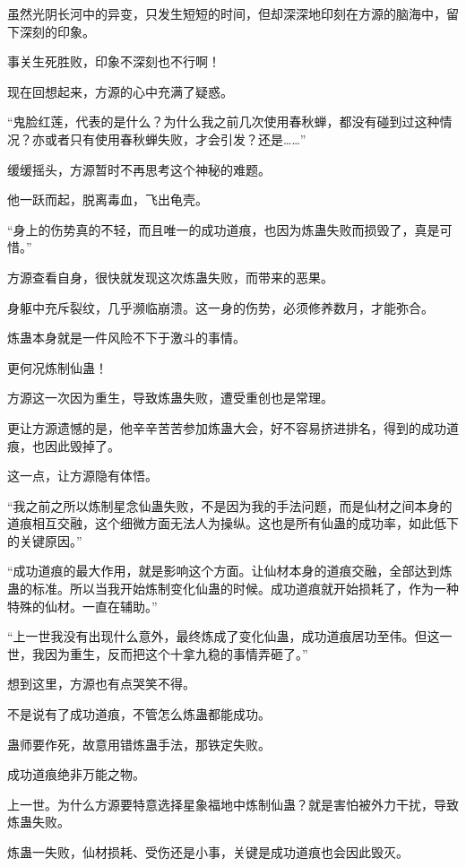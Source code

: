 
\begin{this_body}

虽然光阴长河中的异变，只发生短短的时间，但却深深地印刻在方源的脑海中，留下深刻的印象。

事关生死胜败，印象不深刻也不行啊！

现在回想起来，方源的心中充满了疑惑。

“鬼脸红莲，代表的是什么？为什么我之前几次使用春秋蝉，都没有碰到过这种情况？亦或者只有使用春秋蝉失败，才会引发？还是……”

缓缓摇头，方源暂时不再思考这个神秘的难题。

他一跃而起，脱离毒血，飞出龟壳。

“身上的伤势真的不轻，而且唯一的成功道痕，也因为炼蛊失败而损毁了，真是可惜。”

方源查看自身，很快就发现这次炼蛊失败，而带来的恶果。

身躯中充斥裂纹，几乎濒临崩溃。这一身的伤势，必须修养数月，才能弥合。

炼蛊本身就是一件风险不下于激斗的事情。

更何况炼制仙蛊！

方源这一次因为重生，导致炼蛊失败，遭受重创也是常理。

更让方源遗憾的是，他辛辛苦苦参加炼蛊大会，好不容易挤进排名，得到的成功道痕，也因此毁掉了。

这一点，让方源隐有体悟。

“我之前之所以炼制星念仙蛊失败，不是因为我的手法问题，而是仙材之间本身的道痕相互交融，这个细微方面无法人为操纵。这也是所有仙蛊的成功率，如此低下的关键原因。”

“成功道痕的最大作用，就是影响这个方面。让仙材本身的道痕交融，全部达到炼蛊的标准。所以当我开始炼制变化仙蛊的时候。成功道痕就开始损耗了，作为一种特殊的仙材。一直在辅助。”

“上一世我没有出现什么意外，最终炼成了变化仙蛊，成功道痕居功至伟。但这一世，我因为重生，反而把这个十拿九稳的事情弄砸了。”

想到这里，方源也有点哭笑不得。

不是说有了成功道痕，不管怎么炼蛊都能成功。

蛊师要作死，故意用错炼蛊手法，那铁定失败。

成功道痕绝非万能之物。

上一世。为什么方源要特意选择星象福地中炼制仙蛊？就是害怕被外力干扰，导致炼蛊失败。

炼蛊一失败，仙材损耗、受伤还是小事，关键是成功道痕也会因此毁灭。


\end{this_body}

